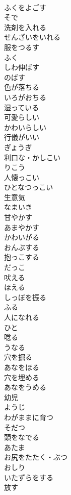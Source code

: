 \documentclass[8pt]{extreport}
\begin{document}
\begin{CJK}{UTF8}{min}
\\	ふくをよごす
\\	そで	
\\	洗剤を入れる	
\\	せんざいをいれる
\\	服をつるす	
\\	ふく
\\	しわ伸ばす	
\\	のばす
\\	色が落ちる	
\\	いろがおちる
\\	湿っている	
\\	可愛らしい	
\\	かわいらしい
\\	行儀がいい	
\\	ぎょうぎ
\\	利口な・かしこい	
\\	りこう
\\	人懐っこい	
\\	ひとなつっこい
\\	生意気	
\\	なまいき
\\	甘やかす	
\\	あまやかす
\\	かわいがる	
\\	おんぶする	
\\	抱っこする	
\\	だっこ
\\	吠える	
\\	ほえる
\\	しっぽを振る	
\\	ふる
\\	人になれる	
\\	ひと
\\	唸る	
\\	うなる
\\	穴を掘る	
\\	あなをほる
\\	穴を埋める	
\\	あなをうめる
\\	幼児	
\\	ようじ
\\	わがままに育つ	
\\	そだつ
\\	頭をなでる	
\\	あたま
\\	お尻をたたく・ぶつ	
\\	おしり
\\	いたずらをする	
\\	放す	

\end{CJK}
\end{document}
